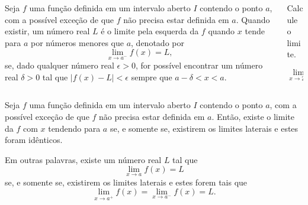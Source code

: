\begin{frame}
  \begin{columns}[onlytextwidth]
    \begin{column}{0.49\textwidth}\vspace{-0.5cm}
      \begin{definition}
        Seja $f$ uma função definida em um intervalo aberto $I$ contendo o ponto $a$, com a possível exceção de que $f$ não precisa estar definida em $a$. Quando existir, um número real $L$ é o limite pela esquerda da $f$ quando $x$ tende para $a$ por números menores que $a$, denotado por 
        \begin{equation*}
          \lim_{x\to a^{-}}{f(x)}=L,
        \end{equation*}
        se, dado qualquer número real $\epsilon>0$, for possível encontrar um número real $\delta>0$ tal que $\left|f\left(x\right)-L\right|<\epsilon$ sempre que $a-\delta<x<a$.
      \end{definition}
    \end{column}
    \begin{column}{0.49\textwidth}\vspace{-0.5cm}
      \begin{example-highlight}
        Calcule o limite.
      \end{example-highlight}
      \begin{equation*}
        \displaystyle\lim_{x\to 2^{-}}{f(x)}
      \end{equation*}
      \begin{figure}
      \end{figure}
    \end{column}
  \end{columns}
\end{frame}

\begin{frame}
  \begin{theorem}
    Seja $f$ uma função definida em um intervalo aberto $I$ contendo o ponto $a$, com a possível exceção de que $f$ não precisa estar definida em $a$. Então, existe o limite da $f$ com $x$ tendendo para $a$ se, e somente se, existirem os limites laterais e estes foram idênticos.
    
    Em outras palavras, existe um número real $L$ tal que
    \begin{equation*}
      \lim_{x\to a}{f\left(x\right)}=L
    \end{equation*}
    se, e somente se, existirem os limites laterais e estes forem tais que
    \begin{equation*}
      \lim_{x\to a^+}{f\left(x\right)}=\lim_{x\to a^-}{f\left(x\right)}=L.
    \end{equation*}
  \end{theorem}
\end{frame}

